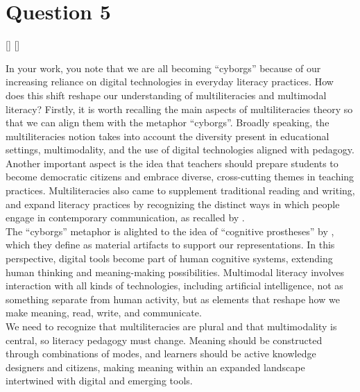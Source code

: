 \documentclass[english]{textolivre}
\begin{document}
\section{Question 5}\label{sec-q5}
\renewcommand{\interviewdate}{\today}
\renewcommand{\interviewcontext}{
    \textbf{Context:} This is a template interview.
}
[\interviewerfname]
[\intervieweefname]
\renewcommand{\interviewcontent}{
   \Qu In your work, you note that we are all becoming “cyborgs” because of our increasing reliance on digital technologies in everyday literacy practices. How does this shift reshape our understanding of multiliteracies and multimodal literacy?
   \An Firstly, it is worth recalling the main aspects of multiliteracies theory so that we can align them with the metaphor “cyborgs”. Broadly speaking, the multiliteracies notion takes into account the diversity present in educational settings, multimodality, and the use of digital technologies aligned with pedagogy. Another important aspect is the idea that teachers should prepare students to become democratic citizens and embrace diverse, cross-cutting themes in teaching practices. Multiliteracies also came to supplement traditional reading and writing, and expand literacy practices by recognizing the distinct ways in which people engage in contemporary communication, as recalled by \textcite{kalantzis2015}. \\
   The “cyborgs” metaphor is alighted to the idea of “cognitive prostheses” by \textcite{kalantzis2020}, which they define as material artifacts to support our representations. In this perspective, digital tools become part of human cognitive systems, extending human thinking and meaning-making possibilities. Multimodal literacy involves interaction with all kinds of technologies, including artificial intelligence, not as something separate from human activity, but as elements that reshape how we make meaning, read, write, and communicate.
   \\We need to recognize that multiliteracies are plural and that multimodality is central, so literacy pedagogy must change. Meaning should be constructed through combinations of modes, and learners should be active knowledge designers and citizens, making meaning within an expanded landscape intertwined with digital and emerging tools.
}
    \begin{description}
        \interviewcontent
    \end{description}
\end{document}
